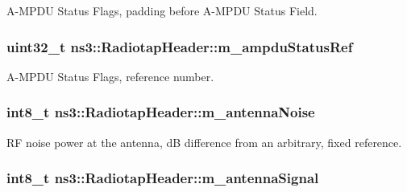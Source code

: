 A-\/\+M\+P\+DU Status Flags, padding before A-\/\+M\+P\+DU Status Field. 

\subsubsection[{\texorpdfstring{m\+\_\+ampdu\+Status\+Ref}{m_ampduStatusRef}}]{\setlength{\rightskip}{0pt plus 5cm}uint32\+\_\+t ns3\+::\+Radiotap\+Header\+::m\+\_\+ampdu\+Status\+Ref\hspace{0.3cm}{\ttfamily [private]}}\hypertarget{classns3_1_1RadiotapHeader_a8be72c0459a3f52b873bb3cc8899885c}{}\label{classns3_1_1RadiotapHeader_a8be72c0459a3f52b873bb3cc8899885c}


A-\/\+M\+P\+DU Status Flags, reference number. 

\subsubsection[{\texorpdfstring{m\+\_\+antenna\+Noise}{m_antennaNoise}}]{\setlength{\rightskip}{0pt plus 5cm}int8\+\_\+t ns3\+::\+Radiotap\+Header\+::m\+\_\+antenna\+Noise\hspace{0.3cm}{\ttfamily [private]}}\hypertarget{classns3_1_1RadiotapHeader_aff9eb044c000563934b7b88edad4ef17}{}\label{classns3_1_1RadiotapHeader_aff9eb044c000563934b7b88edad4ef17}


RF noise power at the antenna, dB difference from an arbitrary, fixed reference. 

\subsubsection[{\texorpdfstring{m\+\_\+antenna\+Signal}{m_antennaSignal}}]{\setlength{\rightskip}{0pt plus 5cm}int8\+\_\+t ns3\+::\+Radiotap\+Header\+::m\+\_\+antenna\+Signal\hspace{0.3cm}{\ttfamily [private]}}\hypertarget{classns3_1_1RadiotapHeader_a53a38d27f954ad23e3178c5894f91479}{}\label{classns3_1_1RadiotapHeader_a53a38d27f954ad23e3178c5894f91479}


